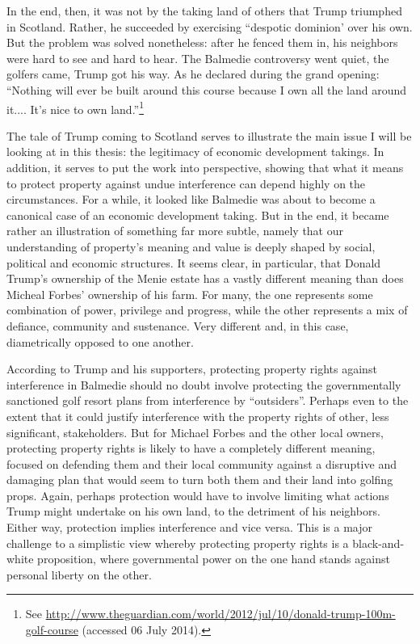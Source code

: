 In the end, then, it was not by the taking land of others that Trump triumphed in Scotland. Rather, he succeeded by exercising ``despotic dominion' over his own. But the problem was solved nonetheless: after he fenced them in, his neighbors were hard to see and hard to hear. The Balmedie controversy went quiet, the golfers came, Trump got his way. As he declared during the grand opening: ``Nothing will ever be built around this course because I own all the land around it.... It's nice to own land.''\footnote{See \url{http://www.theguardian.com/world/2012/jul/10/donald-trump-100m-golf-course} (accessed 06 July 2014).}

The tale of Trump coming to Scotland serves to illustrate the main issue I will be looking at in this thesis: the legitimacy of economic development takings. In addition, it serves to put the work into perspective, showing that what it means to protect property against undue interference can depend highly on the circumstances. For a while, it looked like Balmedie was about to become a canonical case of an economic development taking. But in the end, it became rather an illustration of something far more subtle, namely that our understanding of property's meaning and value is deeply shaped by social, political and economic structures. It seems clear, in particular, that Donald Trump's ownership of the Menie estate has a vastly different meaning than does Micheal Forbes' ownership of his farm. For many, the one represents some combination of power, privilege and progress, while the other represents a mix of defiance, community and sustenance. Very different and, in this case, diametrically opposed to one another. 

According to Trump and his supporters, protecting property rights against interference in Balmedie should no doubt involve protecting the governmentally sanctioned golf resort plans from interference by ``outsiders''. Perhaps even to the extent that it could justify interference with the property rights of other, less significant, stakeholders. But for Michael Forbes and the other local owners, protecting property rights is likely to have a completely different meaning, focused on defending them and their local community against a disruptive and damaging plan that would seem to turn both them and their land into golfing props. Again, perhaps protection would have to involve limiting what actions Trump might undertake on his own land, to the detriment of his neighbors. Either way, protection implies interference and vice versa. This is a major challenge to a simplistic view whereby protecting property rights is a black-and-white proposition, where governmental power on the one hand stands against personal liberty on the other. 

